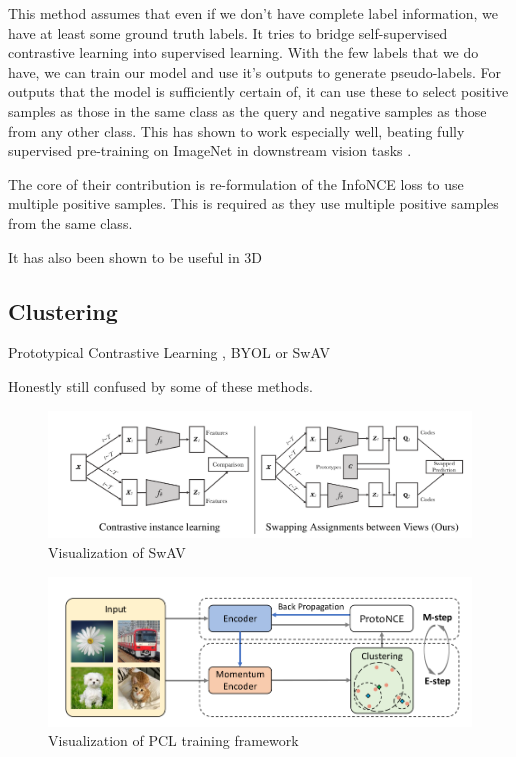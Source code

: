 \documentclass[12pt]{article}
\begin{document}
This method assumes that even if we don't have complete label information, we have at least some ground truth labels. It tries to bridge self-supervised contrastive learning into supervised learning. With the few labels that we do have, we can train our model and use it's outputs to generate pseudo-labels. For outputs that the model is sufficiently certain of, it can use these to select positive samples as those in the same class as the query and negative samples as those from any other class. This has shown to work especially well, beating fully supervised pre-training on ImageNet in downstream vision tasks \cite{khosla_supervised_2021}.
%

The core of their contribution is re-formulation of the InfoNCE loss to use multiple positive samples. This is required as they use multiple positive samples from the same class.
%

It has also been shown to be useful in 3D \cite{jiang_guided_2021}

\subsection{Clustering}
\label{limitations:clustering}

Prototypical Contrastive Learning \cite{li_prototypical_2021}, BYOL \cite{grill_bootstrap_nodate} or SwAV \cite{caron_unsupervised_2021}

Honestly still confused by some of these methods.

\begin{figure}[h!]
    \begin{center}
        \includegraphics[scale=0.35]{images/swav.png}
        \caption{Visualization of SwAV \cite{caron_unsupervised_2021}}
    \end{center}
\end{figure}

\begin{figure}[h!]
    \begin{center}
        \includegraphics[scale=0.35]{images/prototypes.png}
        \caption{Visualization of PCL training framework \cite{li_prototypical_2021}}
    \end{center}
\end{figure}
\end{document}
